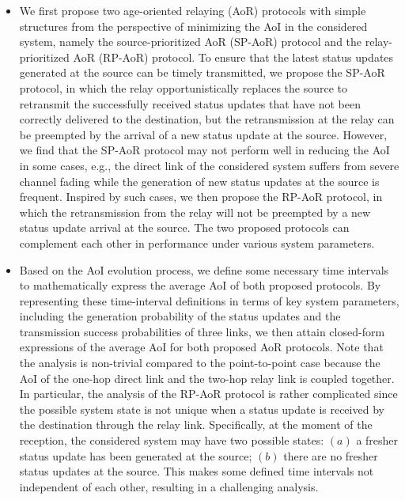 \documentclass{IEEEtran}
\begin{document}
\begin{itemize}
	\item We first propose two age-oriented relaying (AoR) protocols with simple structures from the perspective of minimizing the AoI in the considered system, namely the source-prioritized AoR (SP-AoR) protocol and the relay-prioritized AoR (RP-AoR) protocol. To ensure that the latest status updates generated at the source can be timely transmitted, we propose the SP-AoR protocol, in which the relay opportunistically replaces the source to retransmit the successfully received status updates that have not been correctly delivered to the destination, but the retransmission at the relay can be preempted by the arrival of a new status update at the source. However, we find that the SP-AoR protocol may not perform well in reducing the AoI in some cases, e.g., the direct link of the considered system suffers from severe channel fading while the generation of new status updates at the source is frequent. Inspired by such cases, we then propose the RP-AoR protocol, in which the retransmission from the relay will not be preempted by a new status update arrival at the source. The two proposed protocols can complement each other in performance under various system parameters.
	
	
	\item Based on the AoI evolution process, we define some necessary time intervals to mathematically express the average AoI of both proposed protocols. By representing these time-interval definitions in terms of key system parameters, including the generation probability of the status updates and the transmission success probabilities of three links, we then attain closed-form expressions of the average AoI for both proposed AoR protocols. Note that the analysis is non-trivial compared to the point-to-point case because the AoI of the one-hop direct link and the two-hop relay link is coupled together. In particular, the analysis of the RP-AoR protocol is rather complicated since the possible system state is not unique when a status update is received by the destination through the relay link. Specifically, at the moment of the reception, the considered system may have two possible states: $(a)$ a fresher status update has been generated at the source; $(b)$ there are no fresher status updates at the source. This makes some defined time intervals not independent of each other, resulting in a challenging analysis. 


\end{itemize}
\end{document}
